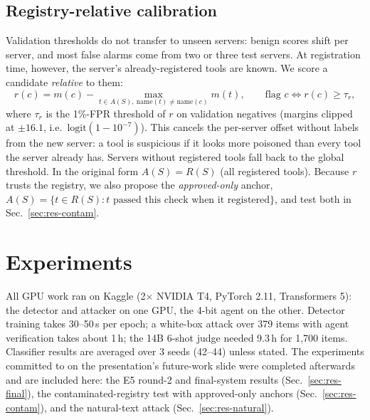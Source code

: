 \documentclass{article}
\begin{document}
\subsection{Registry-relative calibration}
\label{sec:calib}
Validation thresholds do not transfer to unseen servers: benign scores shift per server, and most false alarms come
from two or three test servers. At registration time, however, the server's already-registered tools are known. We
score a candidate \emph{relative} to them:
\begin{equation}
r(c) = m(c) - \max_{t\in A(S),\ \mathrm{name}(t)\neq\mathrm{name}(c)} m(t), \qquad \text{flag } c \iff r(c)\ge \tau_r,
\end{equation}
where $\tau_r$ is the 1\%-FPR threshold of $r$ on validation negatives (margins clipped at
$\pm16.1$, i.e.\ $\mathrm{logit}(1{-}10^{-7})$). This cancels the per-server offset without labels from the new server: a tool is
suspicious if it looks more poisoned than every tool the server already has. Servers without registered tools fall
back to the global threshold. In the original form $A(S)=R(S)$ (all registered tools). Because $r$ trusts the registry,
we also propose the \emph{approved-only} anchor, $A(S)=\{t\in R(S): t \text{ passed this check when it registered}\}$,
and test both in Sec.~\ref{sec:res-contam}.

\section{Experiments}
\label{sec:experiments}

All GPU work ran on Kaggle (2$\times$ NVIDIA T4, PyTorch 2.11, Transformers 5): the detector and attacker on one GPU, the
4-bit agent on the other. Detector training takes 30--50\,s per epoch; a white-box attack over 379 items with agent
verification takes about 1\,h; the 14B 6-shot judge needed 9.3\,h for 1,700 items. Classifier results are averaged over
3 seeds (42--44) unless stated. The experiments committed to on the presentation's future-work slide were completed
afterwards and are included here: the E5 round-2 and final-system results (Sec.~\ref{sec:res-final}), the
contaminated-registry test with approved-only anchors (Sec.~\ref{sec:res-contam}), and the natural-text attack
(Sec.~\ref{sec:res-natural}).
\end{document}

